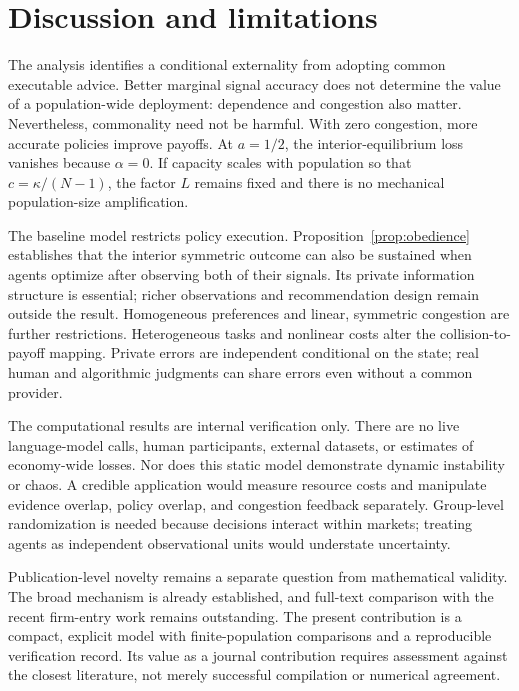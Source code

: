 \documentclass[11pt,a4paper]{article}
\theoremstyle{definition}
\theoremstyle{remark}
\begin{document}
\section{Discussion and limitations}
The analysis identifies a conditional externality from adopting common executable advice. Better marginal signal accuracy does not determine the value of a population-wide deployment: dependence and congestion also matter. Nevertheless, commonality need not be harmful. With zero congestion, more accurate policies improve payoffs. At $a=1/2$, the interior-equilibrium loss vanishes because $\alpha=0$. If capacity scales with population so that $c=\kappa/(N-1)$, the factor $L$ remains fixed and there is no mechanical population-size amplification.

The baseline model restricts policy execution. Proposition~\ref{prop:obedience} establishes that the interior symmetric outcome can also be sustained when agents optimize after observing both of their signals. Its private information structure is essential; richer observations and recommendation design remain outside the result. Homogeneous preferences and linear, symmetric congestion are further restrictions. Heterogeneous tasks and nonlinear costs alter the collision-to-payoff mapping. Private errors are independent conditional on the state; real human and algorithmic judgments can share errors even without a common provider.

The computational results are internal verification only. There are no live language-model calls, human participants, external datasets, or estimates of economy-wide losses. Nor does this static model demonstrate dynamic instability or chaos. A credible application would measure resource costs and manipulate evidence overlap, policy overlap, and congestion feedback separately. Group-level randomization is needed because decisions interact within markets; treating agents as independent observational units would understate uncertainty.

Publication-level novelty remains a separate question from mathematical validity. The broad mechanism is already established, and full-text comparison with the recent firm-entry work remains outstanding. The present contribution is a compact, explicit model with finite-population comparisons and a reproducible verification record. Its value as a journal contribution requires assessment against the closest literature, not merely successful compilation or numerical agreement.
\end{document}
